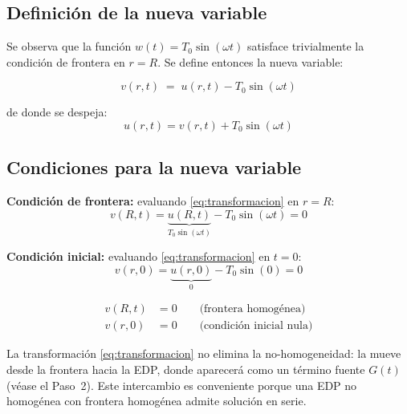 \documentclass[12pt, a4paper]{article}
\newenvironment{resultado}[1][]{%
  \begin{tcolorbox}[resultadoestilo, title={#1}]%
}{%
  \end{tcolorbox}%
}
\newenvironment{nota}{%
  \begin{tcolorbox}[notaestilo]%
}{%
  \end{tcolorbox}%
}
\begin{document}
\subsection{Definición de la nueva variable}

Se observa que la función $w(t) = T_0\sin(\omega t)$ satisface trivialmente la condición de
frontera en $r = R$. Se define entonces la nueva variable:

\begin{equation}
  \boxed{v(r,t) \;=\; u(r,t) - T_0\sin(\omega t)}
  \label{eq:transformacion}
\end{equation}

de donde se despeja:
\begin{equation}
  u(r,t) = v(r,t) + T_0\sin(\omega t)
  \label{eq:u_en_v}
\end{equation}

\subsection{Condiciones para la nueva variable}

\textbf{Condición de frontera:} evaluando \eqref{eq:transformacion} en $r = R$:
\begin{equation}
  v(R,t) = \underbrace{u(R,t)}_{T_0\sin(\omega t)} - T_0\sin(\omega t) = 0
\end{equation}

\textbf{Condición inicial:} evaluando \eqref{eq:transformacion} en $t = 0$:
\begin{equation}
  v(r,0) = \underbrace{u(r,0)}_{0} - T_0\sin(0) = 0
\end{equation}

\begin{resultado}[Nuevo problema — condiciones]
\begin{align*}
  v(R,t) &= 0 \qquad \text{(frontera homogénea)} \\
  v(r,0) &= 0 \qquad \text{(condición inicial nula)}
\end{align*}
\end{resultado}

\begin{nota}
La transformación \eqref{eq:transformacion} no elimina la no-homogeneidad: la mueve desde la
frontera hacia la EDP, donde aparecerá como un término fuente $G(t)$ (véase el Paso~2).
Este intercambio es conveniente porque una EDP no homogénea con frontera homogénea
admite solución en serie.
\end{nota}
\end{document}
